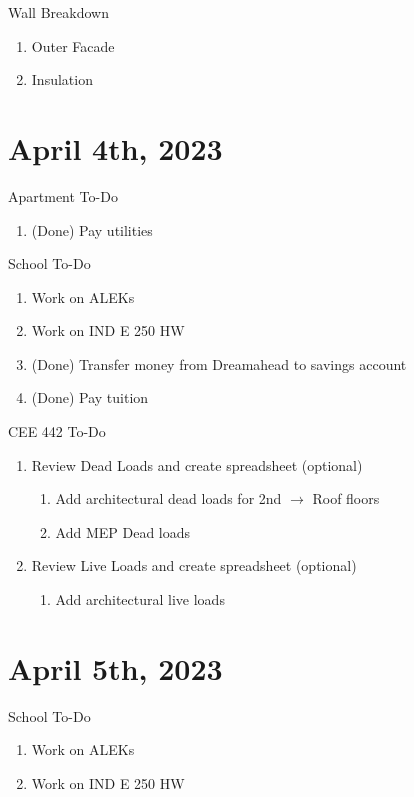 \documentclass{report} %
\begin{document}
\noindent
Wall Breakdown
\begin{enumerate}
    \item Outer Facade
    \item Insulation
\end{enumerate}

\newpage

\section*{April 4th, 2023}
Apartment To-Do
\begin{enumerate}
    \item (Done) Pay utilities
\end{enumerate}

\noindent
School To-Do
\begin{enumerate}
    \item Work on ALEKs
    \item Work on IND E 250 HW
    \item (Done) Transfer money from Dreamahead to savings account
    \item (Done) Pay tuition 
\end{enumerate}

\noindent
CEE 442 To-Do
\begin{enumerate}
    \item Review Dead Loads and create spreadsheet (optional) %
    \begin{enumerate}
        \item Add architectural dead loads for 2nd $\rightarrow$ Roof floors
        \item Add MEP Dead loads
    \end{enumerate}
    \item Review Live Loads and create spreadsheet (optional)
    \begin{enumerate}
        \item Add architectural live loads
    \end{enumerate}
\end{enumerate}

\section*{April 5th, 2023}
\noindent
School To-Do
\begin{enumerate}
    \item Work on ALEKs
    \item Work on IND E 250 HW
\end{enumerate}
\end{document}

